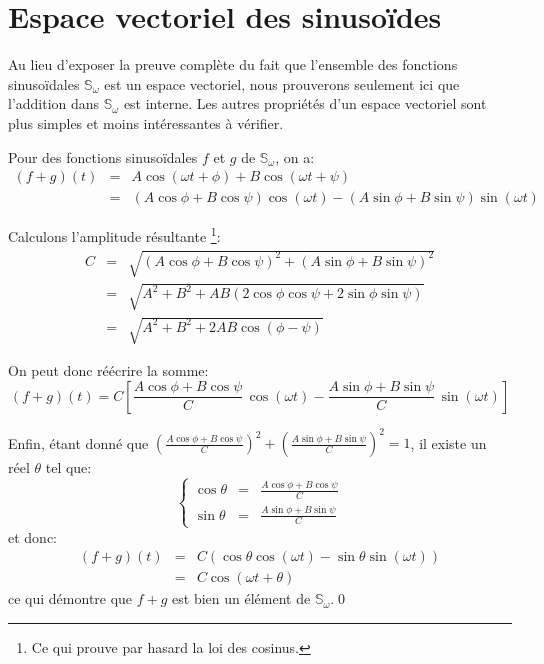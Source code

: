 \section{Espace vectoriel des sinusoïdes}
\label{sec:math/espace-vect-sinus}

Au lieu d'exposer la preuve complète du fait que l'ensemble des fonctions
sinusoïdales $\mathbb{S}_\omega$ est un espace vectoriel,
nous prouverons seulement ici que l'addition dans $\mathbb{S}_\omega$
est interne.
Les autres propriétés d'un espace vectoriel sont plus simples
et moins intéressantes à vérifier.

Pour des fonctions sinusoïdales $f$ et $g$ de $\mathbb{S}_\omega$, on a:
\[
    \begin{array}{rcl}
        (f+g)(t) &=& A\cos(\omega t + \phi) + B\cos(\omega t + \psi) \\
                 &=& (A\cos\phi+B\cos\psi)\cos(\omega t)
                     - (A\sin\phi+B\sin\psi)\sin(\omega t)
    \end{array}
\]

Calculons l'amplitude résultante%
\footnote{
    Ce qui prouve par hasard la loi des cosinus.
}:
\[
    \begin{array}{rcl}
        C &=& \sqrt{(A\cos\phi+B\cos\psi)^2+(A\sin\phi+B\sin\psi)^2} \\
          &=& \sqrt{A^2+B^2+AB(2\cos\phi\cos\psi+2\sin\phi\sin\psi)} \\
          &=& \sqrt{A^2+B^2+2AB\cos(\phi-\psi)}
    \end{array}
\]

On peut donc réécrire la somme:
\[
    (f+g)(t) = C\left[ \frac{A\cos\phi+B\cos\psi}{C}\, \cos(\omega t)
                     - \frac{A\sin\phi+B\sin\psi}{C}\, \sin(\omega t) \right]
\]

Enfin, étant donné que $\left( \frac{A\cos\phi+B\cos\psi}{C} \right)^2
+ \left( \frac{A\sin\phi+B\sin\psi}{C} \right)^2 = 1$,
il existe un réel $\theta$ tel que:
\[
    \left\{
    \begin{array}{rcl}
        \cos\theta &=& \frac{A\cos\phi+B\cos\psi}{C} \\
        \sin\theta &=& \frac{A\sin\phi+B\sin\psi}{C}
    \end{array}
    \right.
\]
et donc:
\[
    \begin{array}{rcl}
        (f+g)(t) &=& C ( \cos\theta\cos(\omega t)
                       - \sin\theta\sin(\omega t) ) \\
                 &=& C\cos(\omega t + \theta)
    \end{array}
\]
ce qui démontre que $f+g$ est bien un élément de $\mathbb{S}_\omega$.\qed
